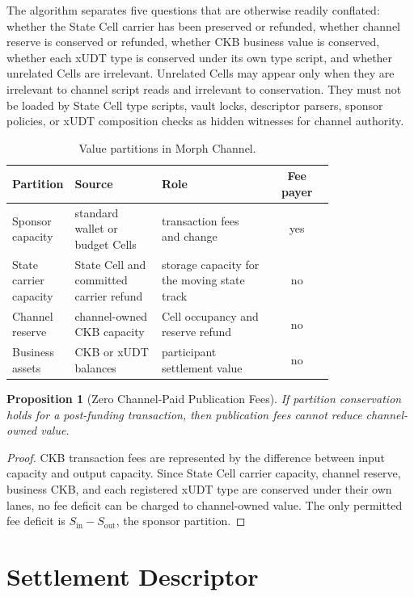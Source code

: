 \documentclass[a4paper,11pt]{article}
\newtheorem{proposition}{Proposition}
\begin{document}
The algorithm separates five questions that are otherwise readily conflated: whether the State Cell carrier has been preserved or refunded, whether channel reserve is conserved or refunded, whether CKB business value is conserved, whether each xUDT type is conserved under its own type script, and whether unrelated Cells are irrelevant. Unrelated Cells may appear only when they are irrelevant to channel script reads and irrelevant to conservation. They must not be loaded by State Cell type scripts, vault locks, descriptor parsers, sponsor policies, or xUDT composition checks as hidden witnesses for channel authority.

\begin{table}[t]
\centering
\small
\setlength{\tabcolsep}{4pt}
\begin{tabular}{p{0.18\linewidth}p{0.27\linewidth}p{0.34\linewidth}c}
\toprule
Partition & Source & Role & Fee payer \\
\midrule
Sponsor capacity & standard wallet or budget Cells & transaction fees and change & yes \\
State carrier capacity & State Cell and committed carrier refund & storage capacity for the moving state track & no \\
Channel reserve & channel-owned CKB capacity & Cell occupancy and reserve refund & no \\
Business assets & CKB or xUDT balances & participant settlement value & no \\
\bottomrule
\end{tabular}
\caption{Value partitions in Morph Channel.}
\label{tab:partitions}
\end{table}

\begin{proposition}[Zero Channel-Paid Publication Fees]
If partition conservation holds for a post-funding transaction, then publication fees cannot reduce channel-owned value.
\end{proposition}

\begin{proof}
CKB transaction fees are represented by the difference between input capacity and output capacity. Since State Cell carrier capacity, channel reserve, business CKB, and each registered xUDT type are conserved under their own lanes, no fee deficit can be charged to channel-owned value. The only permitted fee deficit is $S_{\mathrm{in}}-S_{\mathrm{out}}$, the sponsor partition.
\end{proof}

\clearpage
\section{Settlement Descriptor}
\end{document}
